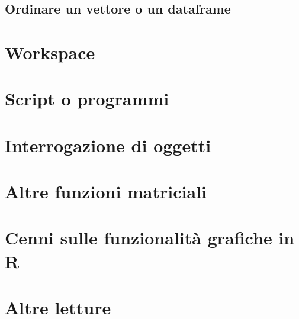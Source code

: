 \documentclass[a4paper,12pt,oneside]{book}
\begin{document}
\hypertarget{ordinare-un-vettore-o-un-dataframe}{%
\subsection*{Ordinare un vettore o un dataframe}\label{ordinare-un-vettore-o-un-dataframe}}

\hypertarget{workspace}{%
\section*{Workspace}\label{workspace}}

\hypertarget{script-o-programmi}{%
\section*{Script o programmi}\label{script-o-programmi}}

\hypertarget{interrogazione-di-oggetti}{%
\section*{Interrogazione di oggetti}\label{interrogazione-di-oggetti}}

\hypertarget{altre-funzioni-matriciali}{%
\section*{Altre funzioni matriciali}\label{altre-funzioni-matriciali}}

\hypertarget{cenni-sulle-funzionalituxe0-grafiche-in-r}{%
\section*{Cenni sulle funzionalità grafiche in R}\label{cenni-sulle-funzionalituxe0-grafiche-in-r}}

\hypertarget{altre-letture-12}{%
\section*{Altre letture}\label{altre-letture-12}}
\end{document}
